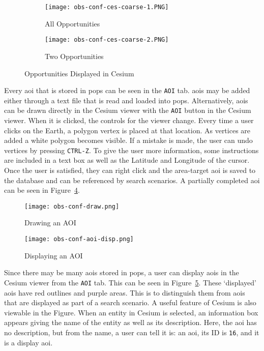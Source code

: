 \begin{figure}[h]
    \centering
    \begin{subfigure}[b]{0.70\textwidth}
	\texttt{[image: obs-conf-ces-coarse-1.PNG]} 
	\caption{All Opportunities}
	\label{fig:obs-conf-ci-1} 
    \end{subfigure}
    \hfill
    \begin{subfigure}[b]{0.70\textwidth}
	\texttt{[image: obs-conf-ces-coarse-2.PNG]} 
	\caption{Two Opportunities}
	\label{fig:obs-conf-ci-2} 
    \end{subfigure}
    \caption{Opportunities Displayed in Cesium}
    \label{fig:obs-conf-ci} 
\end{figure}

Every \gls{aoi} that is stored in \gls{pops} can be seen in the \texttt{AOI}
tab. \glspl{aoi} may be added either through a text file that is read and
loaded into \gls{pops}. Alternatively, \glspl{aoi} can be drawn directly in the
Cesium viewer with the \texttt{AOI} button in the Cesium viewer. When it is
clicked, the controls for the viewer change. Every time a user clicks on the
Earth, a polygon vertex is placed at that location. As vertices are added a
white polygon becomes visible. If a mistake is made, the user can undo vertices
by pressing \texttt{CTRL-Z}. To give the user more information, some
instructions are included in a text box as well as the Latitude and Longitude
of the cursor.  Once the user is satisfied, they can right click and the
area-target \gls{aoi} is saved to the database and can be referenced by search
scenarios. A partially completed \gls{aoi} can be seen in
Figure~\ref{fig:obs-conf-draw}. 

\begin{figure}[h]
    \centering
    \texttt{[image: obs-conf-draw.png]} 
    \caption{Drawing an AOI}
    \label{fig:obs-conf-draw} 
\end{figure}

\begin{figure}[h]
    \centering
    \texttt{[image: obs-conf-aoi-disp.png]} 
    \caption{Displaying an AOI}
    \label{fig:obs-conf-aoi-display} 
\end{figure}

Since there may be many \glspl{aoi} stored in \gls{pops}, a user can display
\glspl{aoi} in the Cesium viewer from the \texttt{AOI} tab. This can be seen in
Figure~\ref{fig:obs-conf-aoi-display}. These `displayed' \glspl{aoi} have red
outlines and purple areas. This is to distinguish them from \glspl{aoi} that
are displayed as part of a search scenario. A useful feature of Cesium is also
viewable in the Figure. When an entity in Cesium is selected, an information
box appears giving the name of the entity as well as its description. Here, the
\gls{aoi} has no description, but from the name, a user can tell it is: an \gls{aoi},
its ID is \texttt{16}, and it is a display \gls{aoi}.


